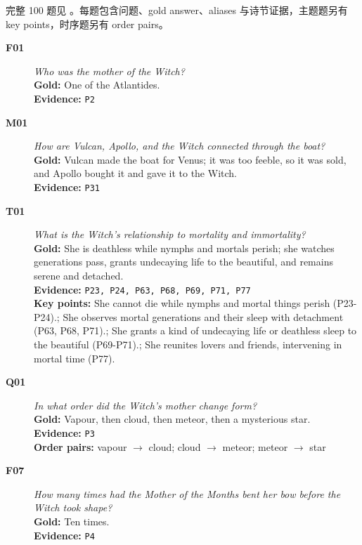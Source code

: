 完整 100 题见 。每题包含问题、gold answer、aliases 与诗节证据，主题题另有 key points，时序题另有 order pairs。

\begin{description}
\item[\textbf{F01}] \emph{Who was the mother of the Witch?}
\\ \textbf{Gold:} One of the Atlantides.
\\ \textbf{Evidence:} \texttt{P2}

\item[\textbf{M01}] \emph{How are Vulcan, Apollo, and the Witch connected through the boat?}
\\ \textbf{Gold:} Vulcan made the boat for Venus; it was too feeble, so it was sold, and Apollo bought it and gave it to the Witch.
\\ \textbf{Evidence:} \texttt{P31}

\item[\textbf{T01}] \emph{What is the Witch's relationship to mortality and immortality?}
\\ \textbf{Gold:} She is deathless while nymphs and mortals perish; she watches generations pass, grants undecaying life to the beautiful, and remains serene and detached.
\\ \textbf{Evidence:} \texttt{P23, P24, P63, P68, P69, P71, P77}
\\ \textbf{Key points:} She cannot die while nymphs and mortal things perish (P23-P24).; She observes mortal generations and their sleep with detachment (P63, P68, P71).; She grants a kind of undecaying life or deathless sleep to the beautiful (P69-P71).; She reunites lovers and friends, intervening in mortal time (P77).

\item[\textbf{Q01}] \emph{In what order did the Witch's mother change form?}
\\ \textbf{Gold:} Vapour, then cloud, then meteor, then a mysterious star.
\\ \textbf{Evidence:} \texttt{P3}
\\ \textbf{Order pairs:} vapour $\rightarrow$ cloud; cloud $\rightarrow$ meteor; meteor $\rightarrow$ star

\item[\textbf{F07}] \emph{How many times had the Mother of the Months bent her bow before the Witch took shape?}
\\ \textbf{Gold:} Ten times.
\\ \textbf{Evidence:} \texttt{P4}


\end{description}
